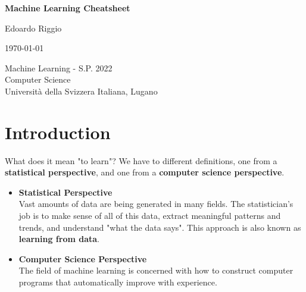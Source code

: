 \documentclass{article}
\begin{document}
\begin{titlepage}
    \begin{center}
        \vspace*{1cm}
        
        \Huge
        \textbf{Machine Learning Cheatsheet}
        
        \vspace{0.5cm}
        \LARGE
        
        \vspace{.5cm}
        
        Edoardo Riggio
   		  \vspace{1.5cm}
       
        \vfill
        
        \today
        
        \vspace{.8cm}
          \Large
          Machine Learning - S.P. 2022 \\
        Computer Science\\
        Universit\`{a} della Svizzera Italiana, Lugano\\
        
    \end{center}
\end{titlepage}

\tableofcontents

\newpage

\section{Introduction}
What does it mean "to learn"? We have to different definitions, one from a \textbf{statistical perspective}, and one from a \textbf{computer science perspective}.

\begin{itemize}
	\item \textbf{Statistical Perspective}
	\vspace{.2cm} \\
	Vast amounts of data are being generated in many fields. The statistician's job is to make sense of all of this data, extract meaningful patterns and trends, and understand "what the data says". This approach is also known as \textbf{learning from data}.
	
	\item \textbf{Computer Science Perspective}
	\vspace{.2cm} \\
	The field of machine learning is concerned with how to construct computer programs that automatically improve with experience.
\end{itemize}
\end{document}
